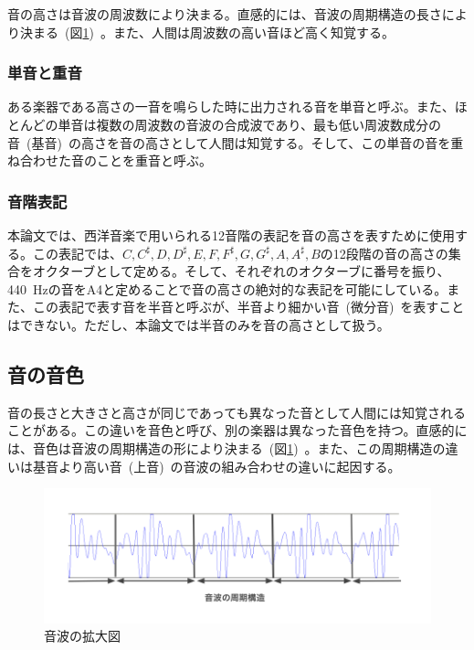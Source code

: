 音の高さは音波の周波数により決まる。直感的には、音波の周期構造の長さにより決まる~(図\ref{fig:gakuon2})~。また、人間は周波数の高い音ほど高く知覚する。

\subsubsection{単音と重音}

ある楽器である高さの一音を鳴らした時に出力される音を単音と呼ぶ。また、ほとんどの単音は複数の周波数の音波の合成波であり、最も低い周波数成分の音~(基音)~の高さを音の高さとして人間は知覚する。そして、この単音の音を重ね合わせた音のことを重音と呼ぶ。

\subsubsection{音階表記}

本論文では、西洋音楽で用いられる12音階の表記を音の高さを表すために使用する。この表記では、$C,C^{\sharp},D,D^{\sharp},E,F,F^{\sharp},G,G^{\sharp},A,A^{\sharp},B$の12段階の音の高さの集合をオクターブとして定める。そして、それぞれのオクターブに番号を振り、440~Hzの音をA4と定めることで音の高さの絶対的な表記を可能にしている。また、この表記で表す音を半音と呼ぶが、半音より細かい音~(微分音)~を表すことはできない。ただし、本論文では半音のみを音の高さとして扱う。

\subsection{音の音色}

音の長さと大きさと高さが同じであっても異なった音として人間には知覚されることがある。この違いを音色と呼び、別の楽器は異なった音色を持つ。直感的には、音色は音波の周期構造の形により決まる~(図\ref{fig:gakuon2})~。また、この周期構造の違いは基音より高い音~(上音)~の音波の組み合わせの違いに起因する。

\begin{figure}[b]
\begin{center}
\includegraphics[width=\hsize]{figure/gakuon2.png}
\caption{音波の拡大図}
\label{fig:gakuon2}
\end{center}
\end{figure}

